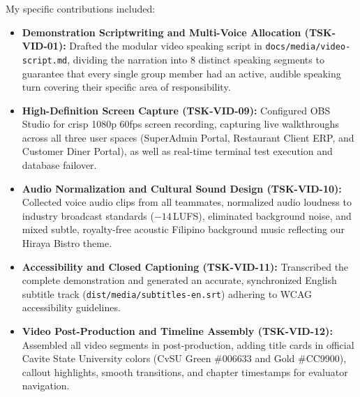 My specific contributions included:
\begin{itemize}
    \item \textbf{Demonstration Scriptwriting and Multi-Voice Allocation (TSK-VID-01):} Drafted the modular video speaking script in \texttt{docs/media/video-script.md}, dividing the narration into 8 distinct speaking segments to guarantee that every single group member had an active, audible speaking turn covering their specific area of responsibility.
    \item \textbf{High-Definition Screen Capture (TSK-VID-09):} Configured OBS Studio for crisp 1080p 60fps screen recording, capturing live walkthroughs across all three user spaces (SuperAdmin Portal, Restaurant Client ERP, and Customer Diner Portal), as well as real-time terminal test execution and database failover.
    \item \textbf{Audio Normalization and Cultural Sound Design (TSK-VID-10):} Collected voice audio clips from all teammates, normalized audio loudness to industry broadcast standards ($-14$\,LUFS), eliminated background noise, and mixed subtle, royalty-free acoustic Filipino background music reflecting our Hiraya Bistro theme.
    \item \textbf{Accessibility and Closed Captioning (TSK-VID-11):} Transcribed the complete demonstration and generated an accurate, synchronized English subtitle track (\texttt{dist/media/subtitles-en.srt}) adhering to WCAG accessibility guidelines.
    \item \textbf{Video Post-Production and Timeline Assembly (TSK-VID-12):} Assembled all video segments in post-production, adding title cards in official Cavite State University colors (CvSU Green \#006633 and Gold \#CC9900), callout highlights, smooth transitions, and chapter timestamps for evaluator navigation.
\end{itemize}

